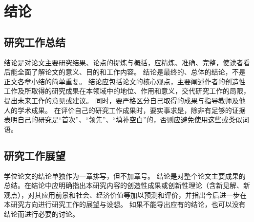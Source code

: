 
\chapter{结{\quad}论}


\section*{研究工作总结}

结论是对论文主要研究结果、论点的提炼与概括，应精炼、准确、完整，使读者看后能全面了解论文的意义、目的和工作内容。
结论是最终的、总体的结论，不是正文各章小结的简单重复。
结论应包括论文的核心观点，主要阐述作者的创造性工作及所取得的研究成果在本领域中的地位、作用和意义，交代研究工作的局限，提出未来工作的意见或建议。
同时，要严格区分自己取得的成果与指导教师及他人的学术成果。
在评价自己的研究工作成果时，要实事求是，除非有足够的证据表明自己的研究是“首次”、“领先”、“填补空白”的，否则应避免使用这些或类似词语。

\section*{研究工作展望}

学位论文的结论单独作为一章排写，但不加章号。
结论是对整个论文主要成果的总结。在结论中应明确指出本研究内容的创造性成果或创新性理论（含新见解、新观点），对其应用前景和社会、经济价值等加以预测和评价，并指出今后进一步在本研究方向进行研究工作的展望与设想。
如果不能导出应有的结论，也可以没有结论而进行必要的讨论。
